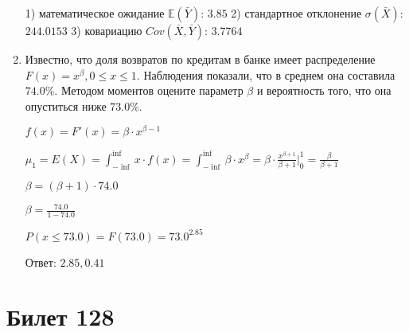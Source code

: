 \documentclass[a4paper,12pt]{article}
\begin{document}
\begin{enumerate}
1) математическое ожидание $\mathbb{E}(\bar Y)$: $3.85$ 
2) стандартное отклонение $\sigma(\bar X)$: $244.0153$
3) ковариацию $Cov(\bar X, \bar Y)$: $3.7764$


\item

    
	Известно, что доля возвратов по кредитам в банке имеет распределение $F(x) = x^{\beta}, 0 \le x \le 1$. Наблюдения показали, что в среднем она составила $74.0$\%. Методом моментов оцените параметр $\beta$ и вероятность того, что она опуститься ниже $73.0$\%.
	


	

	$f(x) = F'(x) = \beta \cdot x^{\beta - 1}$

	$\mu_{1} = E(X) = \int_{-\inf}^{\inf}x \cdot f(x) = \int_{-\inf}^{\inf} \beta \cdot x^{\beta} = \beta \cdot \frac{x^{\beta + 1}}{\beta + 1}\bigg|_0^1 = \frac{\beta}{\beta + 1}$

	$\beta = (\beta + 1) \cdot 74.0$

	$\beta = \frac{74.0}{1 - 74.0}$

	$ P(x \le 73.0) = F(73.0) = 73.0^{2.85} $

    Ответ: $2.85, 0.41$
	


\end{enumerate}

\section{Билет 128}
\end{document}
